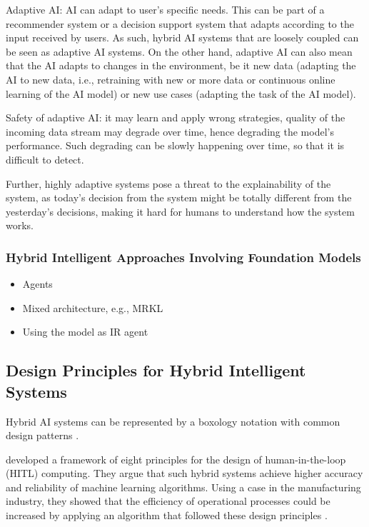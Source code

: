 Adaptive AI: AI can adapt to user's specific needs. This can be part of a recommender system or a decision support
system that adapts according to the input received by users. As such, hybrid AI systems that are loosely coupled can 
be seen as adaptive AI systems. On the other hand, adaptive AI can also mean that the AI adapts to changes in the
environment, be it new data (adapting the AI to new data, i.e., retraining with new or more data or continuous online
learning of the AI model) or new use cases (adapting the task of the AI model).

Safety of adaptive AI: it may learn and apply wrong strategies, quality of the incoming data stream may degrade 
over time, hence degrading the model's performance. Such degrading can be slowly happening over time, so that it 
is difficult to detect.

Further, highly adaptive systems pose a threat to the explainability of the system, as today's decision from 
the system might be totally different from the yesterday's decisions, making it hard for humans to understand
how the system works.

\subsubsection{Hybrid Intelligent Approaches Involving Foundation Models}

\begin{itemize}
    \item Agents 
    \item Mixed architecture, e.g., MRKL \citep{@karpasMRKLSystemsModular2022}
    \item Using the model as IR agent 
\end{itemize}

\subsection{Design Principles for Hybrid Intelligent Systems}

Hybrid AI systems can be represented by a boxology notation with common design patterns \citep{harmelenBoxologyDesignPatterns2019,
vanbekkumModularDesignPatterns2021,witschelVisualizationPatternsHybrid2021}.

\cite{ostheimerAllianceHumansMachines2021} developed a framework of eight principles for the design of human-in-the-loop (HITL) 
computing. They argue that such hybrid systems achieve higher accuracy and reliability of machine learning algorithms. Using a 
case in the manufacturing industry, they showed that the efficiency of operational processes could be increased by applying an 
algorithm that followed these design principles \citep{ostheimerAllianceHumansMachines2021}.

